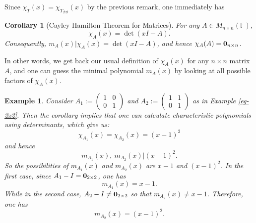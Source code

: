 \documentclass[12pt]{amsbook}
\newtheorem{corollary}[theorem]{Corollary}
\newtheorem{example}[theorem]{Example}
\begin{document}
Since $\chi_T(x) = \chi_{T_{\mathcal{B}\mathcal{B}}}(x)$ by the previous remark, one immediately has
\begin{corollary}[Cayley Hamilton Theorem for Matrices]
For any $A \in M_{n \times n}(\mathbb{F})$,
     $$\chi_{A}(x) = \det(xI -A).$$
Consequently, $m_A(x) | \chi_A(x) = \det(xI-A)$, and hence $\chi_A(A) = {\bf 0}_{n \times n}$.
\end{corollary}
In other words, we get back our usual definition of $\chi_A(x)$ for any $n \times n$ matrix $A$, and one can guess the minimal polynomial $m_A(x)$ by looking at all possible factors of $\chi_A(x)$.

\begin{example}
    Consider $A_1 := \begin{pmatrix} 1 & 0 \\ 0 & 1 \end{pmatrix}$ and $A_2 := \begin{pmatrix} 1 & 1 \\ 0 & 1 \end{pmatrix}$ as in Example \ref{eg-2x2}. Then the corollary implies that one can calculate characteristic polynomials using determinants, which give us:
    $$\chi_{A_1}(x) = \chi_{A_2}(x) = (x-1)^2$$
    and hence 
    $$m_{A_1}(x), \ m_{A_2}(x) | (x-1)^2.$$
    So the possibilities of $m_{A_1}(x)$ and $m_{A_2}(x)$ are $x-1$
    and $(x-1)^2$. 
    In the first case, since $A_1 - I = {\bf 0}_{2 \times 2}$, one has
    $$m_{A_1}(x) = x-1.$$
    While in the second case, $A_2 - I \neq {\bf 0}_{2 \times 2}$ so that $m_{A_2}(x) \neq x-1$. Therefore, one has
    $$m_{A_2}(x) = (x-1)^2.$$
\end{example}
\end{document}
